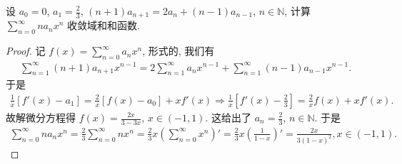 \documentclass[../../main.tex]{subfiles}
\begin{document}
\begin{example}
设 $a_0 = 0$, $a_1 = \frac{2}{3}$, $(n + 1)a_{n+1} = 2a_n + (n - 1)a_{n-1}$, $n \in \mathbb{N}$, 计算 $\sum_{n=0}^{\infty} n a_n x^n$ 收敛域和和函数.
\end{example}
\begin{proof}
记 $f(x) = \sum_{n=0}^{\infty} a_n x^n$, 形式的, 我们有
\begin{align*}
\sum_{n=1}^{\infty} (n + 1) a_{n+1} x^{n - 1} = 2 \sum_{n=1}^{\infty} a_n x^{n - 1} + \sum_{n=1}^{\infty} (n - 1) a_{n-1} x^{n - 1}.
\end{align*}
于是
\begin{align*}
\frac{1}{x} [f'(x) - a_1] = \frac{2}{x} [f(x) - a_0] + x f'(x) \Rightarrow \frac{1}{x} \left[ f'(x) - \frac{2}{3} \right] = \frac{2}{x} f(x) + x f'(x).
\end{align*}
故解微分方程得 $f(x) = \frac{2x}{3 - 3x}$, $x \in (-1,1)$. 这给出了 $a_n = \frac{2}{3}$, $n \in \mathbb{N}$. 于是
\begin{align*}
\sum_{n=0}^{\infty} n a_n x^n = \frac{2}{3} \sum_{n=0}^{\infty} n x^n = \frac{2}{3} x \left( \sum_{n=0}^{\infty} x^n \right)' = \frac{2}{3} x \left( \frac{1}{1 - x} \right)' = \frac{2x}{3(1 - x)^2}, x \in (-1,1).
\end{align*}

\end{proof}
\end{document}
